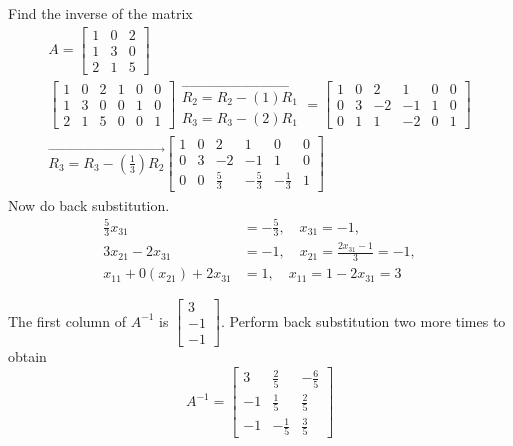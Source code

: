 \documentclass[../main.tex]{subfiles}
\begin{document}
\begin{example}  Find the inverse of the matrix
$$
\begin{array}{c}
A=\left[\begin{array}{lll}
1 & 0 & 2 \\
1 & 3 & 0 \\
2 & 1 & 5
\end{array}\right] \\
{\left[\begin{array}{lll|lll}
	1 & 0 & 2 & 1 & 0 & 0 \\
	1 & 3 & 0 & 0 & 1 & 0 \\
	2 & 1 & 5 & 0 & 0 & 1
	\end{array}\right] \begin{array}{l}
	\overrightarrow{R_{2}=R_{2}-(1) R_{1}} \\
	R_{3}=R_{3}-(2) R_{1}
	\end{array}=\left[\begin{array}{lll|cll}
	1 & 0 & 2 & 1 & 0 & 0 \\
	0 & 3 & -2 & -1 & 1 & 0 \\
	0 & 1 & 1 & -2 & 0 & 1
	\end{array}\right]} \\
	\overrightarrow{R_{3}=R_{3} - \left( \frac{1}{3}\right) R_{2}}
	\left[\begin{array}{ccc|ccc}
	1 & 0 & 2 & 1 & 0 & 0 \\
	0 & 3 & -2 & -1 & 1 & 0 \\
	0 & 0 & \frac{5}{3} & -\frac{5}{3} & -\frac{1}{3} & 1
	\end{array}\right]
\end{array}
$$
Now do back substitution.
$$
\begin{aligned}
\frac{5}{3} x_{31} &=-\frac{5}{3}, \quad x_{31}=-1, \\
3 x_{21}-2 x_{31} &=-1, \quad x_{21}=\frac{2 x_{31}-1}{3}=-1, \\
x_{11}+0\left(x_{21}\right)+2 x_{31} &=1, \quad x_{11}=1-2 x_{31}=3
\end{aligned}
$$


The first column of $A^{-1}$ is $\left[\begin{array}{c}3 \\ -1 \\ -1\end{array}\right] .$ Perform back substitution two more times to obtain
$$
A^{-1}=\left[\begin{array}{ccc}
3 & \frac{2}{5} & -\frac{6}{5} \\
-1 & \frac{1}{5} & \frac{2}{5} \\
-1 & -\frac{1}{5} & \frac{3}{5}
\end{array}\right]
$$
\end{example}
\end{document}
